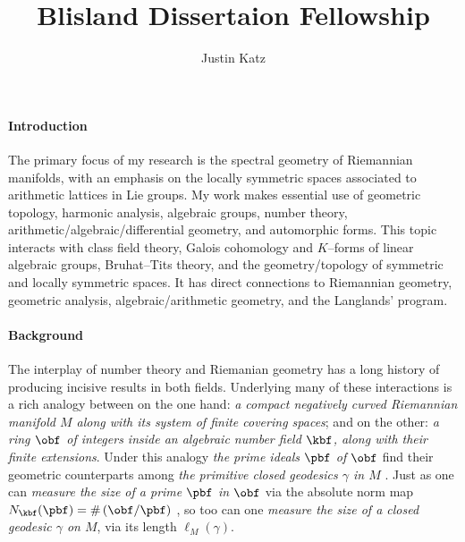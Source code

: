 \documentclass[12pt]{article}
\title{Blisland Dissertaion Fellowship}
\author{Justin Katz}
\begin{document}
\maketitle



\paragraph{Introduction}\label{intro} The primary focus of my research is the spectral geometry of Riemannian manifolds, with an emphasis on the locally symmetric spaces associated to arithmetic lattices in Lie groups. My work makes essential use of geometric topology, harmonic analysis, algebraic groups, number theory, arithmetic/algebraic/differential geometry, and automorphic  forms. This topic interacts with class field theory, Galois cohomology and $K–$forms of linear algebraic groups, Bruhat–Tits theory, and the geometry/topology of symmetric and locally symmetric spaces. It has direct connections to Riemannian geometry, geometric analysis, algebraic/arithmetic geometry, and the Langlands’ program.
	
\paragraph{Background}\label{bg}The interplay of number theory and Riemanian geometry has a long history of producing incisive results in both fields. Underlying many of these interactions is a rich analogy between on the one hand: \emph{a compact negatively curved Riemannian manifold $M$ along with its system of finite covering spaces}; and on the other:  \emph{a ring  $\obf$ of integers inside an algebraic number field $\kbf$, along with their finite extensions}. Under this analogy \emph{the prime ideals $\pbf$ of $\obf$ } find their geometric counterparts among \emph{the primitive closed geodesics $\gamma$ in $M$} .  Just as one can \emph{measure  the size of a prime $\pbf$ in $\obf$} via the absolute norm map $N_\kbf(\pbf) =\# \left(\obf /\pbf\right) $ , so too can one \emph{measure the  size of a closed geodesic $\gamma$  on $M$}, via its length $\ell_M(\gamma)$.
	
\end{document}
